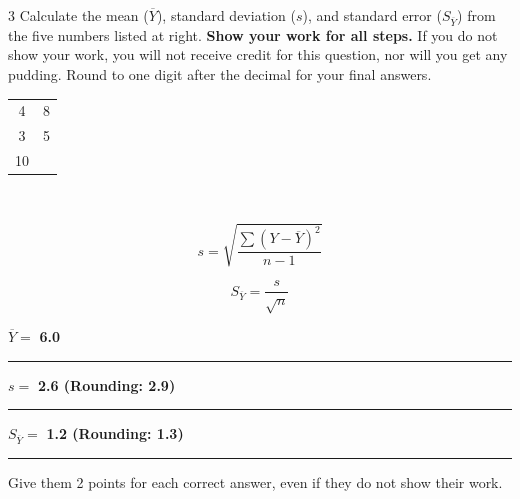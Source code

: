 \showpoints

\question[10]
\begin{multicols}{3}
Calculate the mean ($\overline{Y}$), standard deviation ($s$), and standard error ($S_{\overline{Y}}$) from the five numbers listed at right. \textbf{Show your work for all steps.} If you do not show your work, you will not receive credit for this question, nor will you get any pudding. Round to one digit after the decimal for your final answers.

\columnbreak

\hfill\begin{tabular}{@{}cc@{}}
\toprule
4	& 8\\
3	& 5\\
10	& \\
\bottomrule
\end{tabular}\hfill\

\[s = \sqrt{\frac{\sum{(Y-\overline{Y})^2}}{n-1}}\]

\[S_{\overline{Y}} = \dfrac{s}{\sqrt{n}}\]
	
\columnbreak

$\overline{Y}=$ \ifprintanswers\textbf{6.0}\else\rule{0.75in}{0.4pt}\fi

\vspace*{2\baselineskip}

 $s = $ \ifprintanswers\textbf{2.6 (Rounding: 2.9)}\else\rule{0.75in}{0.4pt}\fi

\vspace*{2\baselineskip}

 $S_{\overline{Y}} = $ \ifprintanswers\textbf{1.2 (Rounding: 1.3)}\else\rule{0.75in}{0.4pt}\fi

\end{multicols}

\begin{solution}

Give them 2 points for each correct answer, even if they do not show their work. 

\end{solution}